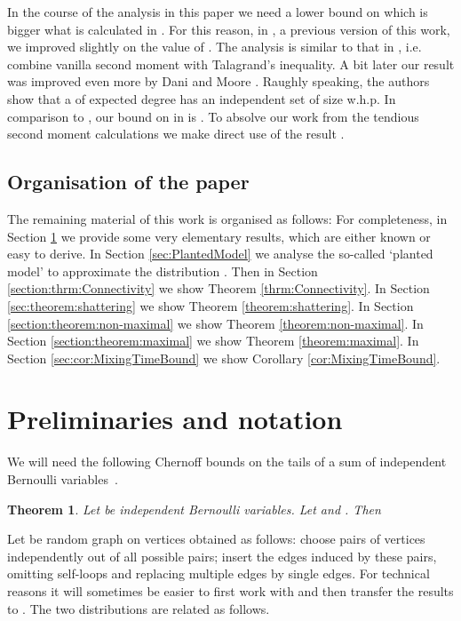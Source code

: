\documentclass[a4paper,10pt]{article}
\newtheorem{theorem}{Theorem}\renewcommand{\thetheorem}{\arabic{theorem}}
\begin{document}
In the course of the analysis in this paper we need a lower bound
on  which is bigger what is calculated in \cite{frieze-is}.
For this reason, in \cite{arxivTR}, a previous version of this
work, we improved slightly on the value of . The
analysis is similar to that in \cite{frieze-is}, i.e. combine
vanilla second moment with Talagrand's inequality. 
A bit later our result was improved even more by Dani and Moore
\cite{W2ndM}. Raughly speaking, the authors show that a 
of expected degree 
has an independent set of size  w.h.p.
In comparison to \cite{W2ndM}, our bound on  in \cite{arxivTR}
is . To absolve
our work from the tendious second moment calculations we make direct
use of the result \cite{W2ndM}.




\subsection{Organisation of the paper}


The remaining material of this work is organised as follows:
For completeness, in Section \ref{sec:Prelim} we provide some 
very elementary results, which are either known  or easy to
derive. 
In Section \ref{sec:PlantedModel} we analyse the so-called `planted
model' to approximate the distribution . 
Then in Section \ref{section:thrm:Connectivity} we show Theorem
\ref{thrm:Connectivity}. In Section \ref{sec:theorem:shattering}
we show Theorem \ref{theorem:shattering}. In Section \ref{section:theorem:non-maximal}
we show Theorem \ref{theorem:non-maximal}. In Section
\ref{section:theorem:maximal} we show  Theorem \ref{theorem:maximal}.
In Section \ref{sec:cor:MixingTimeBound} we show Corollary \ref{cor:MixingTimeBound}.






\section{Preliminaries and notation}\label{sec:Prelim}


\noindent
We will need the following Chernoff bounds on the tails of a sum
of independent Bernoulli variables~\cite{MotwRandAlgBook}.

\begin{theorem}\label{chernoffbounds}
Let  be independent Bernoulli variables.
Let  and .
Then

\end{theorem}


Let  be random graph on  vertices obtained as follows:
choose  pairs of vertices independently out of all  possible
pairs; insert the  edges induced by these pairs, omitting
self-loops and replacing multiple edges by single edges. For technical
reasons it will sometimes be easier to first work with 
and  then transfer the results to . The two distributions
are related as follows.
\end{document}
